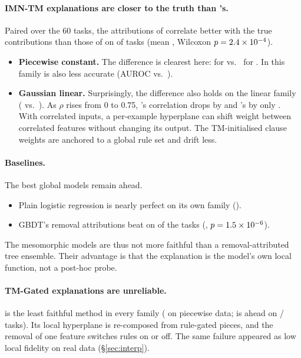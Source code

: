 \paragraph{IMN-TM explanations are closer to the truth than \imn{}'s.} Paired over the 60
tasks, the attributions of  correlate better with the true contributions than those
of \imn{} on \XaiVsimnWins{} of \XaiVsimnN{} tasks (mean \XaiVsimnMean, Wilcoxon
$p=2.4\times 10^{-4}$).
\begin{itemize}
  \item \textbf{Piecewise constant.} The difference is clearest here: \Xaiimntmpiecewise{} for
         vs.\ \Xaiimnpiecewise{} for \imn{}. In this family \imn{} is also less
        accurate (AUROC \XaiAucimnpiecewise{} vs.\ \XaiAucimntmpiecewise).
  \item \textbf{Gaussian linear.} Surprisingly, the difference also holds on the linear family
        (\Xaiimntmlinear{} vs.\ \Xaiimnlinear). As $\rho$ rises from 0 to 0.75, \imn{}'s
        correlation drops by \XaiLinDropimn{} and 's by only \XaiLinDropimntm.
        With correlated inputs, a per-example hyperplane can shift weight between correlated
        features without changing its output. The TM-initialised clause weights are anchored
        to a global rule set and drift less.
\end{itemize}

\paragraph{Baselines.} The best global models remain ahead.
\begin{itemize}
  \item Plain logistic regression is nearly perfect on its own family (\Xailrlinear).
  \item GBDT's removal attributions beat  on \XaiVsgbdtLosses{} of the
        \XaiVsgbdtN{} tasks (\XaiVsgbdtMean, $p=1.5\times 10^{-6}$).
\end{itemize}
The mesomorphic models are thus not more faithful than a removal-attributed tree ensemble.
Their advantage is that the explanation is the model's own local function, not a post-hoc
probe.

\paragraph{TM-Gated explanations are unreliable.}  is the least faithful method
in every family (\Xaitmgatedpiecewise{} on piecewise data;  is ahead on
\XaiVstmgatedWins/\XaiVstmgatedN{} tasks). Its local hyperplane is re-composed from rule-gated
pieces, and the removal of one feature switches rules on or off. The same failure appeared as
low local fidelity on real data (\S\ref{sec:interp}).
